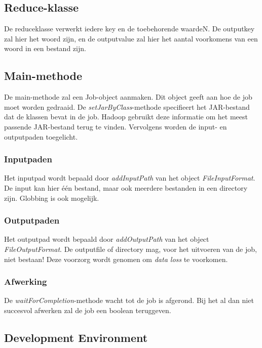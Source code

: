 \documentclass[a4paper,10pt,twoside]{report}
\begin{document}
\subsection{Reduce-klasse}

De reduceklasse verwerkt iedere key en de toebehorende waardeN. De outputkey zal hier het woord zijn, en de outputvalue zal hier het aantal voorkomens van een woord in een bestand zijn. 

\subsection{Main-methode}

De main-methode zal een Job-object aanmaken. Dit object geeft aan hoe de job moet worden gedraaid. De \textit{setJarByClass}-methode specifieert het JAR-bestand dat de klassen bevat in de job. Hadoop gebruikt deze informatie om het meest passende JAR-bestand terug te vinden. Vervolgens worden de input- en outputpaden toegelicht. 

\subsubsection{Inputpaden}
Het inputpad wordt bepaald door \textit{addInputPath} van het object \textit{FileInputFormat}. De input kan hier één bestand, maar ook meerdere bestanden in een directory zijn. Globbing is ook mogelijk.

\subsubsection{Outputpaden}

Het outputpad wordt bepaald door \textit{addOutputPath} van het object \textit{FileOutputFormat}. De outputfile of directory mag, voor het uitvoeren van de job, niet bestaan! Deze voorzorg wordt genomen om \textit{data loss} te voorkomen.

\subsubsection{Afwerking}

De \textit{waitForCompletion}-methode wacht tot de job is afgerond. Bij het al dan niet succesvol afwerken zal de job een boolean teruggeven. 

\subsection{Development Environment}
\end{document}
